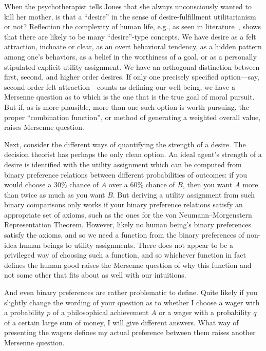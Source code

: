 When the psychotherapist tells Jones that she always unconsciously wanted to kill her mother, is that a ``desire''
in the sense of desire-fulfillment utilitarianism or not? Reflection the complexity of human life, e.g., as seen in literature~\parencite[pp.~249--250]{AllenGeometry}, shows that there are likely
to be many ``desire''-type concepts. We have desire as a felt attraction, inchoate or clear, as an overt behavioral
tendency, as a hidden pattern among one's behaviors, as a belief in the worthiness of a goal, or as a personally
stipulated explicit utility assignment. We have an orthogonal distinction between first, second, and higher order desires. 
If only one precisely specified option---say, second-order felt attraction---counts as defining our well-being, we
have a Mersenne question as to which is the one that is the true goal of moral pursuit. But if, as is more plausible, more
than one such option is worth pursuing, the proper ``combination function'', or method of generating a weighted
overall value, raises Mersenne question.

Next, consider the different ways of quantifying the strength of a desire. The decision theorist has perhaps the
only clean option. An ideal agent's strength of a desire is identified with the utility assignment which can be computed from binary
preference relations between different probabilities of outcomes: if you would choose a 30\% chance of $A$ over a
60\% chance of $B$, then you want $A$ more than twice as much as you want $B$. But deriving a utility assignment
from such binary comparisons only works if your binary preference relations satisfy an appropriate set of axioms,
such as the ones for the von Neumann--Morgenstern Representation Theorem. However, likely no human being's 
binary preferences satisfy the axioms, and so we need a function from the binary preferences
of non-idea human beings to utility assignments. There does not appear to be a privileged way of choosing such
a function, and so whichever function in fact defines the human good raises the Mersenne question of why this
function and not some other that fits about as well with our intuitions. 

And even binary preferences are rather problematic to define. Quite likely if you slightly change the wording
of your question as to whether I choose a wager with a probability $p$ of a philosophical achievement $A$ or 
a wager with a probability $q$ of a certain large sum of money, I will give different answers. What way of presenting
the wagers defines my actual preference between them raises another Mersenne question.

